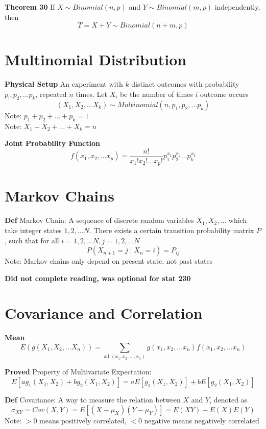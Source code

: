 \documentclass[11pt,notitlepage]{report}
\begin{document}
\textbf{Theorem 30} If $X \sim Binomial(n, p)$ and $Y \sim Binomial(m, p)$ independently, then
$$T = X + Y \sim Binomial(n+m, p)$$

\newpage

\section{Multinomial Distribution}

\textbf{Physical Setup} An experiment with $k$ distinct outcomes with probability $p_!, p_2, \dots p_k$, repeated $n$ times. Let $X_i$ be the number of times $i$ outcome occurs
$$(X_1, X_2, \dots X_k) \sim Multinomial(n,p_1,p_2,\dots p_k)$$
\hspace*{5mm} Note: $p_1 + p_2 + \dots + p_k = 1$\\
\hspace*{5mm} Note: $X_1 + X_2 + \dots + X_k = n$


\textbf{Joint Probability Function}
$$f(x_1, x_2, \dots x_p) = \frac{n!}{x_1!x_2!\dots x_p!} p_1^{x_1}p_2^{x_2}\dots p_k^{x_k}$$


\section{Markov Chains}

\textbf{Def} Markov Chain: A sequence of discrete random variables $X_1, X_2, \dots$ which take integer states $1, 2, \dots N$. There exists a certain transition probability matrix $P$, such that for all $i = 1,2,\dots N, j=1,2,\dots N$
$$P(X_{n+1} =j\mid X_n = i) = P_{ij}$$
\hspace*{5mm} Note: Markov chains only depend on present state, not past states

\textbf{Did not complete reading, was optional for stat 230}

\section{Covariance and Correlation}


\textbf{Mean}
$$E(g(X_1,X_2,\dots X_n)) = \sum_{\text{all }(x_1,x_2,\dots, x_n)} g(x_1,x_2,\dots x_n)f(x_1,x_2,\dots x_n)$$

\textbf{Proved} Property of Multivariate Expectation: 
$$E[ag_1(X_1,X_2) + b g_2(X_1,X_2)] = aE[g_1(X_1,X_2)] + bE[g_2(X_1, X_2)]$$

\textbf{Def} Covariance: A way to measure the relation between $X$ and $Y$, denoted as
$$\sigma_{XY} = Cov(X, Y) = E[(X-\mu_X)(Y-\mu_Y)] = E(XY) - E(X)E(Y)$$
\hspace*{5mm} Note: $>0$ means positively correlated, $<0$ negative means negatively correlated
\end{document}
